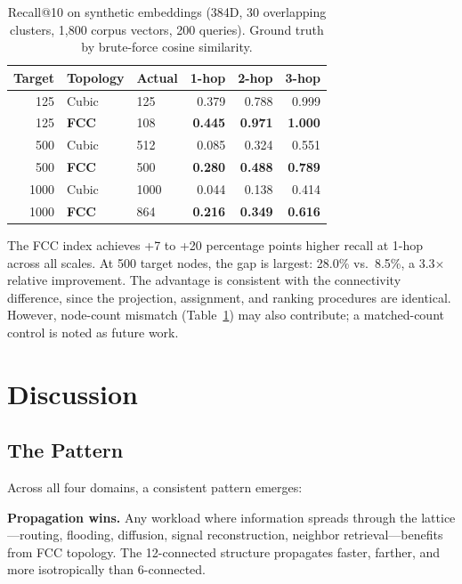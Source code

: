 \documentclass[11pt]{article}
\begin{document}
\begin{table}[H]
\centering
\caption{Recall@10 on synthetic embeddings (384D, 30 overlapping
clusters, 1{,}800 corpus vectors, 200 queries). Ground truth by
brute-force cosine similarity.}
\label{tab:index}
\begin{tabular}{rllrrr}
\toprule
Target & Topology & Actual & 1-hop & 2-hop & 3-hop \\
\midrule
125  & Cubic       & 125 & 0.379 & 0.788 & 0.999 \\
125  & \textbf{FCC}& 108 & \textbf{0.445} & \textbf{0.971} & \textbf{1.000} \\
\midrule
500  & Cubic       & 512 & 0.085 & 0.324 & 0.551 \\
500  & \textbf{FCC}& 500 & \textbf{0.280} & \textbf{0.488} & \textbf{0.789} \\
\midrule
1000 & Cubic       & 1000 & 0.044 & 0.138 & 0.414 \\
1000 & \textbf{FCC}& 864 & \textbf{0.216} & \textbf{0.349} & \textbf{0.616} \\
\bottomrule
\end{tabular}
\end{table}

The FCC index achieves +7 to +20 percentage points higher recall
at 1-hop across all scales. At 500 target nodes, the gap is
largest: 28.0\% vs.\ 8.5\%, a 3.3$\times$ relative improvement.
The advantage is consistent with the connectivity difference, since the
projection, assignment, and ranking procedures are identical. However,
node-count mismatch (Table~\ref{tab:index}) may also contribute; a
matched-count control is noted as future work.

\section{Discussion}
\label{sec:discussion}

\subsection{The Pattern}

Across all four domains, a consistent pattern emerges:

\textbf{Propagation wins.} Any workload where information spreads
through the lattice---routing, flooding, diffusion, signal
reconstruction, neighbor retrieval---benefits from FCC topology.
The 12-connected structure propagates faster, farther, and more
isotropically than 6-connected.
\end{document}
